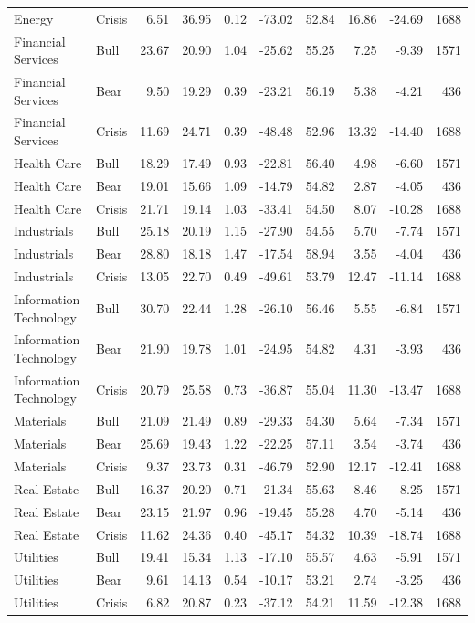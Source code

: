 \begin{landscape}
\begin{longtable}{llrrrrrrrr}
Energy & Crisis & 6.51 & 36.95 & 0.12 & -73.02 & 52.84 & 16.86 & -24.69 & 1688 \\
Financial Services & Bull & 23.67 & 20.90 & 1.04 & -25.62 & 55.25 & 7.25 & -9.39 & 1571 \\
Financial Services & Bear & 9.50 & 19.29 & 0.39 & -23.21 & 56.19 & 5.38 & -4.21 & 436 \\
Financial Services & Crisis & 11.69 & 24.71 & 0.39 & -48.48 & 52.96 & 13.32 & -14.40 & 1688 \\
Health Care & Bull & 18.29 & 17.49 & 0.93 & -22.81 & 56.40 & 4.98 & -6.60 & 1571 \\
Health Care & Bear & 19.01 & 15.66 & 1.09 & -14.79 & 54.82 & 2.87 & -4.05 & 436 \\
Health Care & Crisis & 21.71 & 19.14 & 1.03 & -33.41 & 54.50 & 8.07 & -10.28 & 1688 \\
Industrials & Bull & 25.18 & 20.19 & 1.15 & -27.90 & 54.55 & 5.70 & -7.74 & 1571 \\
Industrials & Bear & 28.80 & 18.18 & 1.47 & -17.54 & 58.94 & 3.55 & -4.04 & 436 \\
Industrials & Crisis & 13.05 & 22.70 & 0.49 & -49.61 & 53.79 & 12.47 & -11.14 & 1688 \\
Information Technology & Bull & 30.70 & 22.44 & 1.28 & -26.10 & 56.46 & 5.55 & -6.84 & 1571 \\
Information Technology & Bear & 21.90 & 19.78 & 1.01 & -24.95 & 54.82 & 4.31 & -3.93 & 436 \\
Information Technology & Crisis & 20.79 & 25.58 & 0.73 & -36.87 & 55.04 & 11.30 & -13.47 & 1688 \\
Materials & Bull & 21.09 & 21.49 & 0.89 & -29.33 & 54.30 & 5.64 & -7.34 & 1571 \\
Materials & Bear & 25.69 & 19.43 & 1.22 & -22.25 & 57.11 & 3.54 & -3.74 & 436 \\
Materials & Crisis & 9.37 & 23.73 & 0.31 & -46.79 & 52.90 & 12.17 & -12.41 & 1688 \\
Real Estate & Bull & 16.37 & 20.20 & 0.71 & -21.34 & 55.63 & 8.46 & -8.25 & 1571 \\
Real Estate & Bear & 23.15 & 21.97 & 0.96 & -19.45 & 55.28 & 4.70 & -5.14 & 436 \\
Real Estate & Crisis & 11.62 & 24.36 & 0.40 & -45.17 & 54.32 & 10.39 & -18.74 & 1688 \\
Utilities & Bull & 19.41 & 15.34 & 1.13 & -17.10 & 55.57 & 4.63 & -5.91 & 1571 \\
Utilities & Bear & 9.61 & 14.13 & 0.54 & -10.17 & 53.21 & 2.74 & -3.25 & 436 \\
Utilities & Crisis & 6.82 & 20.87 & 0.23 & -37.12 & 54.21 & 11.59 & -12.38 & 1688 \\
\end{longtable}
\end{landscape}
